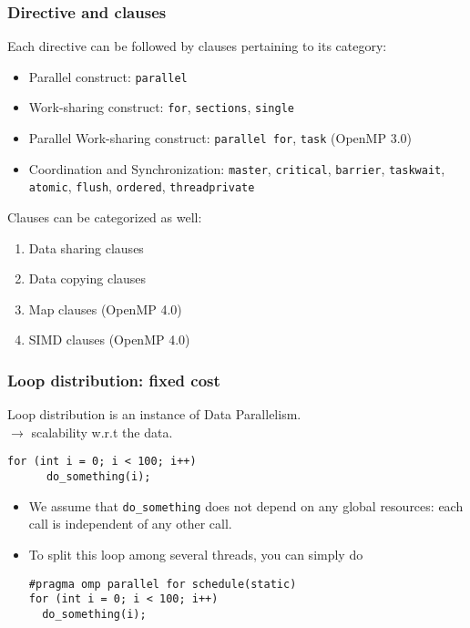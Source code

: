 \begin{frame}
\frametitle{Directive and clauses}

Each directive can be followed by clauses pertaining to its category:

\begin{itemize}
\item Parallel construct: \texttt{parallel}

\medskip
\item Work-sharing construct: \texttt{for}, \texttt{sections}, \texttt{single}

\medskip
\item Parallel Work-sharing construct: \texttt{parallel for}, \texttt{task} (OpenMP 3.0)

\medskip
\item Coordination and Synchronization: \texttt{master}, \texttt{critical}, \texttt{barrier}, \texttt{taskwait}, \texttt{atomic}, \texttt{flush}, \texttt{ordered}, \texttt{threadprivate}

\end{itemize}

\medskip
Clauses can be categorized as well:
\begin{enumerate}
\item Data sharing clauses
\item Data copying clauses
\item Map clauses (OpenMP 4.0)
\item SIMD clauses (OpenMP 4.0)
\end{enumerate}

\end{frame}


\begin{frame}[fragile]
  \frametitle{Loop distribution: fixed cost}

Loop distribution is an instance of Data Parallelism.\\
$\rightarrow$ scalability w.r.t the data.

\bigskip

  \begin{lstlisting}[style=c]
    for (int i = 0; i < 100; i++)
      do_something(i);
  \end{lstlisting}
  \begin{itemize}
  \item We assume that \texttt{do\_something} does not depend on any global
    resources: each call is independent of any other call.
  \item To split this loop among several threads, you can simply do
    \begin{lstlisting}[style=c]
#pragma omp parallel for schedule(static)
for (int i = 0; i < 100; i++)
  do_something(i);
    \end{lstlisting}
  \end{itemize}
\end{frame}

